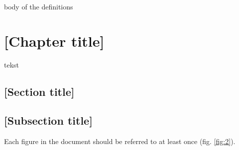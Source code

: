 \documentclass[a4paper,twoside,12pt]{book}
\newtheorem{Definition}{Definition}
\newtheorem{Example}{Example}
\newtheorem{Theorem}{Theorem}
\begin{document}
%

body of the definitions
%
%







\chapter{[Chapter title]}

tekst

\section{[Section title]}

\section{[Subsection title]}

Each figure in the document should be referred to at least once (fig. \ref{fig:2}).
\end{document}
